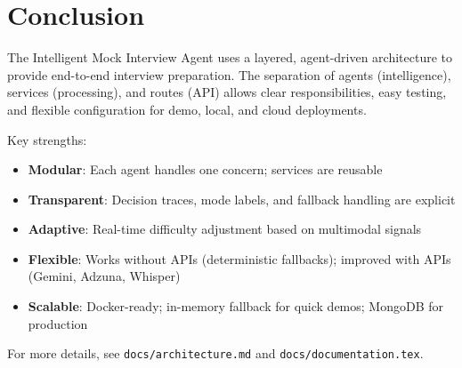 \documentclass[11pt]{article}
\begin{document}
\newpage

\section{Conclusion}

The Intelligent Mock Interview Agent uses a layered, agent-driven architecture to provide end-to-end interview preparation. The separation of agents (intelligence), services (processing), and routes (API) allows clear responsibilities, easy testing, and flexible configuration for demo, local, and cloud deployments.

Key strengths:
\begin{itemize}
  \item \textbf{Modular}: Each agent handles one concern; services are reusable
  \item \textbf{Transparent}: Decision traces, mode labels, and fallback handling are explicit
  \item \textbf{Adaptive}: Real-time difficulty adjustment based on multimodal signals
  \item \textbf{Flexible}: Works without APIs (deterministic fallbacks); improved with APIs (Gemini, Adzuna, Whisper)
  \item \textbf{Scalable}: Docker-ready; in-memory fallback for quick demos; MongoDB for production
\end{itemize}

For more details, see \texttt{docs/architecture.md} and \texttt{docs/documentation.tex}.
\end{document}
